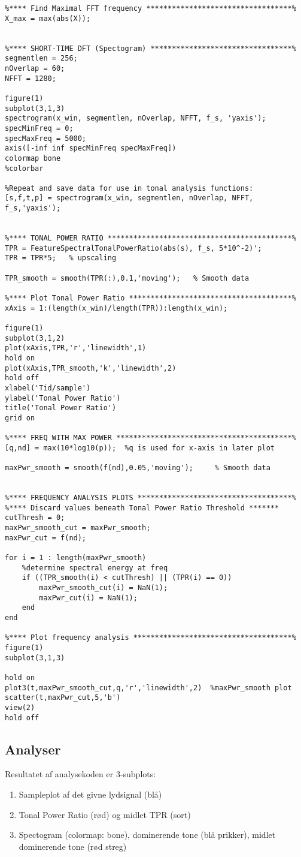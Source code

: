\begin{verbatim}
%**** Find Maximal FFT frequency **********************************%
X_max = max(abs(X));


%**** SHORT-TIME DFT (Spectogram) *********************************%
segmentlen = 256;
nOverlap = 60;
NFFT = 1280;

figure(1)
subplot(3,1,3)
spectrogram(x_win, segmentlen, nOverlap, NFFT, f_s, 'yaxis');
specMinFreq = 0;
specMaxFreq = 5000;
axis([-inf inf specMinFreq specMaxFreq])
colormap bone
%colorbar

%Repeat and save data for use in tonal analysis functions:
[s,f,t,p] = spectrogram(x_win, segmentlen, nOverlap, NFFT, f_s,'yaxis'); 


%**** TONAL POWER RATIO *******************************************% 
TPR = FeatureSpectralTonalPowerRatio(abs(s), f_s, 5*10^-2)';
TPR = TPR*5;   % upscaling

TPR_smooth = smooth(TPR(:),0.1,'moving');   % Smooth data

%**** Plot Tonal Power Ratio **************************************%
xAxis = 1:(length(x_win)/length(TPR)):length(x_win);

figure(1)
subplot(3,1,2)
plot(xAxis,TPR,'r','linewidth',1)
hold on
plot(xAxis,TPR_smooth,'k','linewidth',2)
hold off
xlabel('Tid/sample')
ylabel('Tonal Power Ratio')
title('Tonal Power Ratio')
grid on

%**** FREQ WITH MAX POWER *****************************************%
[q,nd] = max(10*log10(p));  %q is used for x-axis in later plot

maxPwr_smooth = smooth(f(nd),0.05,'moving');     % Smooth data


%**** FREQUENCY ANALYSIS PLOTS ************************************%
%**** Discard values beneath Tonal Power Ratio Threshold *******
cutThresh = 0;
maxPwr_smooth_cut = maxPwr_smooth;
maxPwr_cut = f(nd);

for i = 1 : length(maxPwr_smooth)
    %determine spectral energy at freq
    if ((TPR_smooth(i) < cutThresh) || (TPR(i) == 0))
        maxPwr_smooth_cut(i) = NaN(1);
        maxPwr_cut(i) = NaN(1);
    end
end

%**** Plot frequency analysis *************************************%
figure(1)
subplot(3,1,3)

hold on
plot3(t,maxPwr_smooth_cut,q,'r','linewidth',2)  %maxPwr_smooth plot
scatter(t,maxPwr_cut,5,'b')
view(2)
hold off

\end{verbatim}

\newpage
\subsection{Analyser}
Resultatet af analysekoden er 3-subplots:
\begin{enumerate}
	\item Sampleplot af det givne lydsignal (blå)
	\item Tonal Power Ratio (rød) og midlet TPR (sort)
	\item Spectogram (colormap: bone), dominerende tone (blå prikker), midlet dominerende tone (rød streg)
\end{enumerate}

